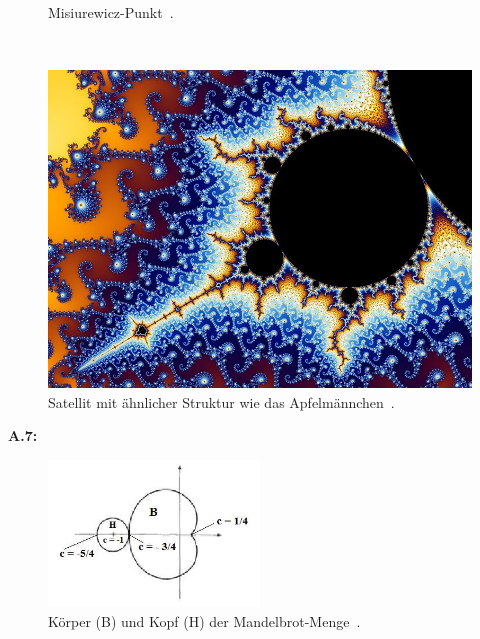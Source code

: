 \begin{figure}[H]
\begin{minipage}[t]{0.40\textwidth}
    \vspace*{-4ex}
    \caption{Misiurewicz-Punkt~\cite{beyer_partial_2005-3}.}
    \label{app:6.4}
  \end{minipage}
  \\[4ex]
  \begin{minipage}[t]{0.46\textwidth}
    \centering
    \includegraphics[width=\linewidth]{images/zoom/800px-Mandel_zoom_08_satellite_antenna}
    \vspace*{-4ex}
    \caption{Satellit mit ähnlicher Struktur wie das Apfelmännchen~\cite{beyer_partial_2005-4}.}
    \label{app:6.5}
  \end{minipage}
\end{figure}

\noindent\textbf{A.7:}\label{app:7}
\begin{figure}[H]
\centering
\includegraphics[width=0.5\textwidth]{images/bodyHeadMandelbrotSet}
\caption{
  Körper (B) und Kopf (H) der Mandelbrot-Menge~\cite{mahanta_mandelbrot_2016}.
}
\label{fig:body-and-head-of-mandelbrot-set}
\end{figure}

